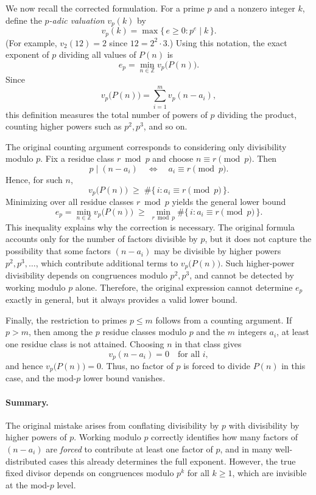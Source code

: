 \documentclass{article}
\theoremstyle{plain}
\theoremstyle{definition}
\theoremstyle{remark}
\begin{document}
We now recall the corrected formulation.
For a prime $p$ and a nonzero integer $k$, define the \emph{$p$-adic valuation}
$v_p(k)$ by
\[
v_p(k)=\max\{\,e\ge 0 : p^e \mid k\,\}.
\]
(For example, $v_2(12)=2$ since $12=2^2\cdot 3$.)
Using this notation, the exact exponent of $p$ dividing all values of $P(n)$ is
\[
e_p=\min_{n\in\mathbb Z} v_p\!\bigl(P(n)\bigr).
\]
Since
\[
v_p\!\bigl(P(n)\bigr)=\sum_{i=1}^m v_p(n-a_i),
\]
this definition measures the total number of powers of $p$ dividing the product,
counting higher powers such as $p^2,p^3$, and so on.

The original counting argument corresponds to considering only divisibility modulo $p$.
Fix a residue class $r\bmod p$ and choose $n\equiv r\pmod p$.
Then
\[
p \mid (n-a_i) \quad \Longleftrightarrow \quad a_i \equiv r \pmod p.
\]
Hence, for such $n$,
\[
v_p\!\bigl(P(n)\bigr)\;\ge\;\#\{\,i : a_i \equiv r \pmod p\,\}.
\]
Minimizing over all residue classes $r\bmod p$ yields the general lower bound
\[
e_p=\min_{n\in\mathbb Z} v_p\!\bigl(P(n)\bigr)
\;\ge\;
\min_{r \bmod p}\#\{\,i : a_i \equiv r \pmod p\,\}.
\]
This inequality explains why the correction is necessary.
The original formula accounts only for the number of factors divisible by $p$,
but it does not capture the possibility that some factors $(n-a_i)$ may be
divisible by higher powers $p^2,p^3,\dots$, which contribute additional terms to
$v_p\!\bigl(P(n)\bigr)$.
Such higher-power divisibility depends on congruences modulo $p^2,p^3$, and cannot
be detected by working modulo $p$ alone.
Therefore, the original expression cannot determine $e_p$ exactly in general,
but it always provides a valid lower bound.

Finally, the restriction to primes $p\le m$ follows from a counting argument.
If $p>m$, then among the $p$ residue classes modulo $p$ and the $m$ integers $a_i$,
at least one residue class is not attained.
Choosing $n$ in that class gives
\[
v_p(n-a_i)=0 \quad \text{for all } i,
\]
and hence $v_p\!\bigl(P(n)\bigr)=0$.
Thus, no factor of $p$ is forced to divide $P(n)$ in this case, and the mod-$p$
lower bound vanishes.

\paragraph{Summary.}
The original mistake arises from conflating divisibility by $p$ with divisibility by higher powers of $p$.
Working modulo $p$ correctly identifies how many factors of $(n-a_i)$ are \emph{forced} to contribute at least one factor of $p$, and in many well-distributed cases this already determines the full exponent.
However, the true fixed divisor depends on congruences modulo $p^k$ for all $k\ge 1$, which are invisible at the mod-$p$ level.
\end{document}
